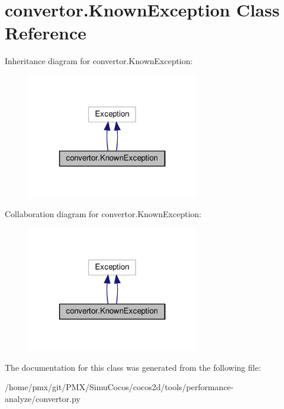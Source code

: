 \hypertarget{classconvertor_1_1KnownException}{}\section{convertor.\+Known\+Exception Class Reference}
\label{classconvertor_1_1KnownException}


Inheritance diagram for convertor.\+Known\+Exception\+:
\nopagebreak
\begin{figure}[H]
\begin{center}
\leavevmode
\includegraphics[width=214pt]{classconvertor_1_1KnownException__inherit__graph}
\end{center}
\end{figure}


Collaboration diagram for convertor.\+Known\+Exception\+:
\nopagebreak
\begin{figure}[H]
\begin{center}
\leavevmode
\includegraphics[width=214pt]{classconvertor_1_1KnownException__coll__graph}
\end{center}
\end{figure}


The documentation for this class was generated from the following file\+:\begin{DoxyCompactItemize}
\item 
/home/pmx/git/\+P\+M\+X/\+Simu\+Cocos/cocos2d/tools/performance-\/analyze/convertor.\+py\end{DoxyCompactItemize}
